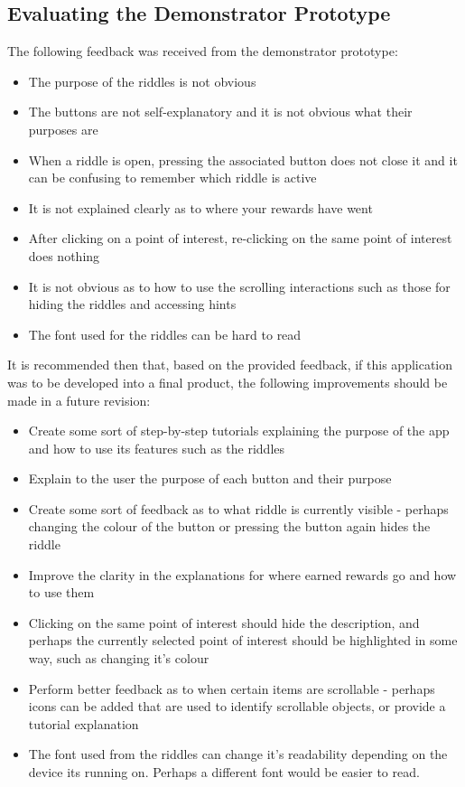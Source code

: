\documentclass[10pt,twocolumn]{article} %
\begin{document}
\subsection*{Evaluating the Demonstrator Prototype}
The following feedback was received from the demonstrator prototype:
\begin{itemize}[noitemsep]
 \item The purpose of the riddles is not obvious 
 \item The buttons are not self-explanatory and it is not obvious what their purposes are
 \item When a riddle is open, pressing the associated button does not close it and it can be confusing to remember which riddle is active
 \item It is not explained clearly as to where your rewards have went
 \item After clicking on a point of interest, re-clicking on the same point of interest does nothing
 \item It is not obvious as to how to use the scrolling interactions such as those for hiding the riddles and accessing hints
 \item The font used for the riddles can be hard to read
\end{itemize}

It is recommended then that, based on the provided feedback, if this application was to be developed into a final product, the following improvements should be made in a future revision:
\begin{itemize}[noitemsep]
 \item Create some sort of step-by-step tutorials explaining the purpose of the app and how to use its features such as the riddles
 \item Explain to the user the purpose of each button and their purpose
 \item Create some sort of feedback as to what riddle is currently visible - perhaps changing the colour of the button or pressing the button again hides the riddle
 \item Improve the clarity in the explanations for where earned rewards go and how to use them
 \item Clicking on the same point of interest should hide the description, and perhaps the currently selected point of interest should be highlighted in some way, such as changing it's colour
 \item Perform better feedback as to when certain items are scrollable - perhaps icons can be added that are used to identify scrollable objects, or provide a tutorial explanation
 \item The font used from the riddles can change it's readability depending on the device its running on. Perhaps a different font would be easier to read.
\end{itemize}
\end{document}
